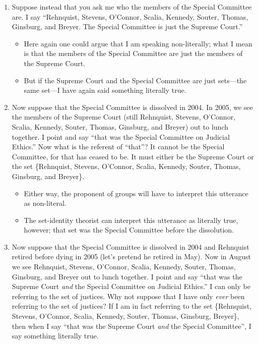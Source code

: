 \documentclass[11pt]{article}
\begin{document}
\begin{spacing}{1.5}
\begin{enumerate}
  \item Suppose instead that you ask me who the members of the Special
    Committee are.  I say ``Rehnquist, Stevens, O'Connor, Scalia,
    Kennedy, Souter, Thomas, Ginsburg, and Breyer.  The Special
    Committee is just the Supreme Court.''  
    \begin{itemize}
      \item Here again one could argue that I am speaking
        non-literally; what I mean is that the members of the Special
        Committee are just the members of the Supreme Court.  
      \item But if the Supreme Court and the Special Committee are
        just sets---the same set---I have again said something
        literally true.
    \end{itemize}

  \item Now suppose that the Special Committee is dissolved in 2004.
    In 2005, we see the members of the Supreme Court (still Rehnquist,
    Stevens, O'Connor, Scalia, Kennedy, Souter, Thomas, Ginsburg, and
    Breyer) out to lunch together.  I point and say ``that was the
    Special Committee on Judicial Ethics.''  Now what is the referent
    of ``that''?  It cannot be the Special Committee, for that has
    ceased to be.  It must either be the Supreme Court or the set
    \{Rehnquist, Stevens, O'Connor, Scalia, Kennedy, Souter, Thomas,
    Ginsburg, and Breyer\}.  
    \begin{itemize}
      \item Either way, the proponent of groups will
    have to interpret this utterance as non-literal.  
      \item The set-identity theorist can interpret this utterance as
        literally true, however; that set was the Special Committee
        before the dissolution.
    \end{itemize}

  \item Now suppose that the Special Committee is dissolved in 2004
    and Rehnquist retired before dying in 2005 (let's pretend he
    retired in May).  Now in August we see Rehnquist, Stevens,
    O'Connor, Scalia, Kennedy, Souter, Thomas, Ginsburg, and Breyer
    out to lunch together.  I point and say ``that was the Supreme
    Court {\em and} the Special Committee on Judicial Ethics.''  I can
    only be referring to the set of justices.  Why not suppose that I
    have only {\em ever} been referring to the set of justices?  If I
    am in fact referring to the set \{Rehnquist, Stevens, O'Connor,
    Scalia, Kennedy, Souter, Thomas, Ginsburg, Breyer\}, then when I
    say ``that was the Supreme Court {\em and} the Special
    Committee'', I say something literally true.
\end{enumerate}


\end{spacing}
\end{document}
